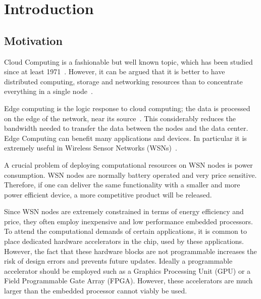 
\chapter{Introduction}
\label{chapter:introduction}

\section{Motivation}
\label{section:motivation}

Cloud Computing is a fashionable but well known topic, which has been
studied since at least 1971~\cite{white1971network}. However, it can
be argued that it is better to have distributed computing, storage and
networking resources than to concentrate everything in a single
node~\cite{armbrust2010view}.

Edge computing is the logic response to cloud computing; the data is
processed on the edge of the network, near its
source~\cite{gaber2014pocket}. This considerably reduces the bandwidth
needed to transfer the data between the nodes and the data
center. Edge Computing can benefit many applications and devices. In
particular it is extremely useful in Wireless Sensor Networks
(WSNs)~\cite{beckman2016waggle}.

A crucial problem of deploying computational resources on WSN nodes is
power consumption. WSN nodes are normally battery operated and very
price sensitive. Therefore, if one can deliver the same functionality
with a smaller and more power efficient device, a more competitive
product will be released.

Since WSN nodes are extremely constrained in terms of energy
efficiency and price, they often employ inexpensive and low
performance embedded processors. To attend the computational demands
of certain applications, it is common to place dedicated hardware
accelerators in the chip, used by these applications. However, the
fact that these hardware blocks are not programmable increases the
risk of design errors and prevents future updates. Ideally a
programmable accelerator should be employed such as a Graphics
Processing Unit (GPU) or a Field Programmable Gate Array
(FPGA). However, these accelerators are much larger than the embedded
processor cannot viably be used.

